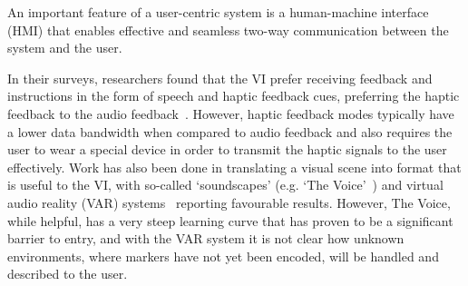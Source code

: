 \documentclass[format=sigconf, review=true, screen=true, anonymous=true]{acmart}
\begin{document}


An important feature of a user-centric system is a human-machine interface (HMI) that enables effective and seamless two-way communication between the system and the user. %

In their surveys, researchers found that the VI prefer receiving feedback and instructions in the form of speech and haptic feedback cues, preferring the haptic feedback to the audio feedback~\cite{khoo2016multimodal, ross2000wearable}. However, haptic feedback modes typically have a lower data bandwidth when compared to audio feedback and also requires the user to wear a special device in order to transmit the haptic signals to the user effectively. Work has also been done in translating a visual scene into format that is useful to the VI, with so-called `soundscapes' (e.g. `The Voice'~\cite{meijer2010}) and virtual audio reality (VAR) systems~\cite{frauenberger2003} reporting favourable results. However, The Voice, while helpful, has a very steep learning curve that has proven to be a significant barrier to entry, and with the VAR system it is not clear how unknown environments, where markers have not yet been encoded, will be handled and described to the user. 
\end{document}
